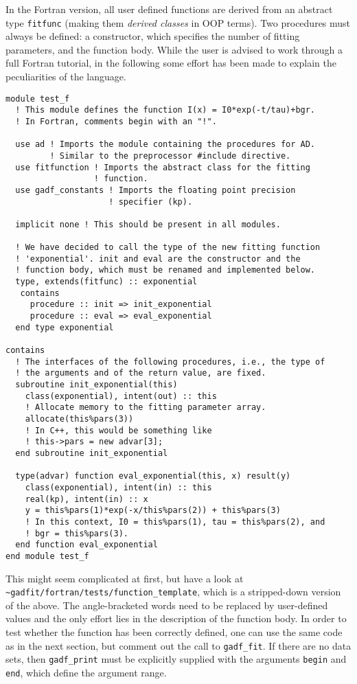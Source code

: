 \documentclass{article}
\begin{document}
In the Fortran version, all user defined functions are derived from an abstract type \texttt{fitfunc} (making them \textit{derived classes} in OOP terms). Two procedures must always be defined: a constructor, which specifies the number of fitting parameters, and the function body. While the user is advised to work through a full Fortran tutorial, in the following some effort has been made to explain the peculiarities of the language.
\begin{verbatim}
module test_f
  ! This module defines the function I(x) = I0*exp(-t/tau)+bgr.
  ! In Fortran, comments begin with an "!".

  use ad ! Imports the module containing the procedures for AD.
         ! Similar to the preprocessor #include directive.
  use fitfunction ! Imports the abstract class for the fitting
                  ! function.
  use gadf_constants ! Imports the floating point precision
                     ! specifier (kp).

  implicit none ! This should be present in all modules.

  ! We have decided to call the type of the new fitting function
  ! 'exponential'. init and eval are the constructor and the
  ! function body, which must be renamed and implemented below.
  type, extends(fitfunc) :: exponential
   contains
     procedure :: init => init_exponential
     procedure :: eval => eval_exponential
  end type exponential

contains
  ! The interfaces of the following procedures, i.e., the type of
  ! the arguments and of the return value, are fixed.
  subroutine init_exponential(this)
    class(exponential), intent(out) :: this
    ! Allocate memory to the fitting parameter array.
    allocate(this%pars(3))
    ! In C++, this would be something like
    ! this->pars = new advar[3];
  end subroutine init_exponential

  type(advar) function eval_exponential(this, x) result(y)
    class(exponential), intent(in) :: this
    real(kp), intent(in) :: x
    y = this%pars(1)*exp(-x/this%pars(2)) + this%pars(3)
    ! In this context, I0 = this%pars(1), tau = this%pars(2), and
    ! bgr = this%pars(3).
  end function eval_exponential
end module test_f
\end{verbatim}
This might seem complicated at first, but have a look at \\
\verb+~gadfit/fortran/tests/function_template+, which is a stripped-down version of the above. The angle-bracketed words need to be replaced by user-defined values and the only effort lies in the description of the function body. In order to test whether the function has been correctly defined, one can use the same code as in the next section, but comment out the call to \verb+gadf_fit+. If there are no data sets, then \verb+gadf_print+ must be explicitly supplied with the arguments \verb+begin+ and \verb+end+, which define the argument range.
\end{document}
